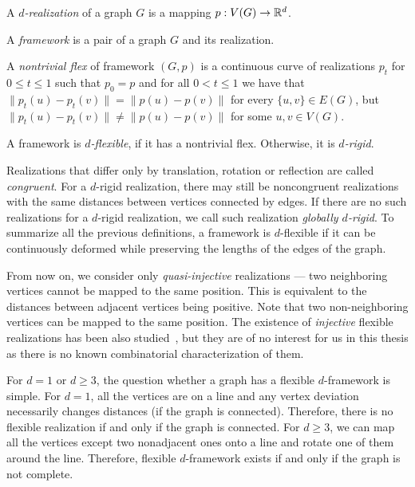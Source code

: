 %
\begin{definition}[\( d \)-realization]
	A \emph{\( d \)-realization} of a graph \( G \) is a mapping \( p: V(G) \to \mathbb{R}^d \).
\end{definition}
%
\begin{definition}[Framework]
	A \emph{framework} is a pair of a graph \( G \) and its realization.
\end{definition}
%
\begin{definition}
	A \emph{nontrivial flex} of framework \( (G, p) \) is a continuous curve of realizations \( p_t \)
	for \( 0 \le t \le 1\) such that
	\( p_0 = p \) and for all \( 0 < t \le 1 \)
	we have that
	\( \|p_t(u) - p_t(v)\| = \|p(u) - p(v)\|\) for every \( \{u, v\} \in E(G) \),
	but \( \|p_t(u) - p_t(v)\| \ne \|p(u) - p(v)\| \) for some \( u, v \in V (G) \).
\end{definition}
%
\begin{definition}
	A framework is \emph{\( d \)-flexible}, if it has a nontrivial flex.
	Otherwise, it is \emph{\( d \)-rigid}.
\end{definition}
%
Realizations that differ only by translation,
rotation or reflection are called \emph{congruent}.
%
For a \( d \)-rigid realization, there may still be noncongruent realizations
with the same distances between vertices connected by edges.
%
If there are no such realizations for a \( d \)-rigid realization,
we call such realization \emph{globally \( d \)-rigid}.
To summarize all the previous definitions,
a framework is \( d \)-flexible if it can be continuously deformed
while preserving the lengths of the edges of the graph.

From now on, we consider only \emph{quasi-injective} realizations ---
two neighboring vertices cannot be mapped to the same position.
This is equivalent to the distances between adjacent vertices being positive.
Note that two non-neighboring vertices can be mapped to the same position.
The existence of \emph{injective} flexible realizations
has been also studied~\cite{injective_realizations},
but they are of no interest for us in this thesis
as there is no known combinatorial characterization of them.

For \( d = 1 \) or \( d \ge 3 \),
the question whether a graph has a flexible \( d \)-framework is simple.
%
For \( d = 1 \), all the vertices are on a line
and any vertex deviation necessarily changes distances (if the graph is connected).
Therefore, there is no flexible realization if and only if the graph is connected.
%
For \( d \ge 3 \), we can map all the vertices except two nonadjacent ones
onto a line and rotate one of them around the line.
Therefore, flexible \( d \)-framework exists if and only if the graph is not complete.

